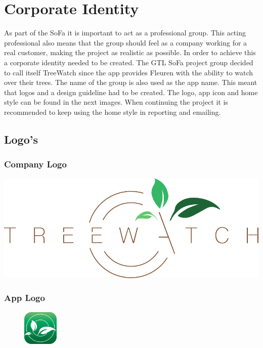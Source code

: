 \documentclass[12pt]{article}
\begin{document}
	\pagebreak
	
	\tableofcontents
	\clearpage
{}
\section{Corporate Identity}
As part of the SoFa it is important to act as a professional group. This acting professional also means that the group should feel as a company working for a real customer, making the project as realistic as possible. In order to achieve this a corporate identity needed to be created. The GTL SoFa project group decided to call itself TreeWatch since the app provides Fleuren with the ability to watch over their trees. The name of the group is also used as the app name. This meant that logos and a design guideline had to be created. The logo, app icon and home style can be found in the next images. When continuing the project it is recommended to keep using the home style in reporting and emailing.
\subsection{Logo's}
\subsubsection{Company Logo}
\includegraphics[width=.9\textwidth]{TreewatchLogo.pdf}
\subsubsection{App Logo}
\begin{figure}[h]
	\centering
	\includegraphics[width=0.15\textwidth]{TreewatchAppLogo.pdf}
\end{figure}
\clearpage
\end{document}

